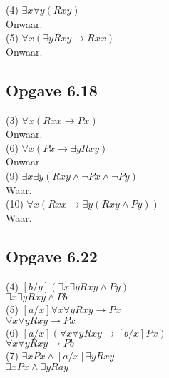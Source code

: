 \documentclass[11pt]{article}
\newcommand{\E}{\exists}
\newcommand{\A}{\forall}
\begin{document}
  (4) $\E x \A y(Rxy)$ \\

  Onwaar. \\

  (5) $\A x(\E y Rxy \rightarrow Rxx)$ \\

  Onwaar. \\


  \subsection*{Opgave 6.18}

  (3) $\A x(Rxx \rightarrow Px)$ \\

  Onwaar. \\

  (6) $\A x(Px \rightarrow \E y Rxy)$ \\

  Onwaar. \\

  (9) $\E x \E y(Rxy \wedge \neg Px \wedge \neg Py)$ \\

  Waar. \\

  (10) $\A x(Rxx \rightarrow \E y(Rxy \wedge Py))$ \\

  Waar. \\


  \subsection*{Opgave 6.22}


  (4) $[b/y](\E x \E y Rxy \wedge Py)$ \\

  $\E x \E y Rxy \wedge Pb$ \\

  (5) $[a/x] \A x \A y Rxy \rightarrow Px$ \\

  $\A x \A y Rxy \rightarrow Px$ \\

  (6) $[a/x] (\A x \A y Rxy \rightarrow [b/x]Px)$ \\

  $\A x \A y Rxy \rightarrow Pb$ \\

  (7) $\E x Px \wedge [a/x] \E y Rxy$ \\

  $\E x Px \wedge \E y Ray$ \\
\end{document}
